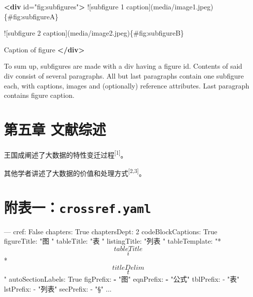\documentclass[]{article}
\newenvironment{Shaded}{}{}
\newcommand{\AttributeTok}[1]{\textcolor[rgb]{0.49,0.56,0.16}{#1}}
\newcommand{\FunctionTok}[1]{\textcolor[rgb]{0.02,0.16,0.49}{#1}}
\newcommand{\KeywordTok}[1]{\textcolor[rgb]{0.00,0.44,0.13}{\textbf{#1}}}
\newcommand{\NormalTok}[1]{#1}
\newcommand{\OtherTok}[1]{\textcolor[rgb]{0.00,0.44,0.13}{#1}}
\newcommand{\StringTok}[1]{\textcolor[rgb]{0.25,0.44,0.63}{#1}}
\begin{document}
\begin{Shaded}
\begin{Highlighting}[]
\KeywordTok{<div}\OtherTok{ id=}\StringTok{"fig:subfigures"}\KeywordTok{>}
\NormalTok{![subfigure 1 caption](media/image1.jpeg)\{#fig:subfigureA\}}

\NormalTok{![subfigure 2 caption](media/image2.jpeg)\{#fig:subfigureB\}}

\NormalTok{Caption of figure}
\KeywordTok{</div>}
\end{Highlighting}
\end{Shaded}

To sum up, subfigures are made with a div having a figure id. Contents
of said div consist of several paragraphs. All but last paragraphs
contain one subfigure each, with captions, images and (optionally)
reference attributes. Last paragraph contains figure caption.

\hypertarget{sec:ux7b2cux4e94ux7ae0-ux6587ux732eux7efcux8ff0}{%
\section{第五章
文献综述}\label{sec:ux7b2cux4e94ux7ae0-ux6587ux732eux7efcux8ff0}}

王国成阐述了大数据的特性变迁过程\textsuperscript{{[}1{]}}。

其他学者讲述了大数据的价值和处理方式\textsuperscript{{[}2,3{]}}。

\hypertarget{sec:ux9644ux8868ux4e00crossref.yaml}{%
\section*{\texorpdfstring{附表一：\texttt{crossref.yaml}}{附表一：crossref.yaml}}\label{sec:ux9644ux8868ux4e00crossref.yaml}}

\begin{Shaded}
\begin{Highlighting}[]
\OtherTok{---}
\FunctionTok{cref:}\AttributeTok{ False}
\FunctionTok{chapters:}\AttributeTok{ True}
\FunctionTok{chaptersDept:}\AttributeTok{ 2}
\FunctionTok{codeBlockCaptions:}\AttributeTok{ True}
\FunctionTok{figureTitle:}\AttributeTok{ }\StringTok{"图 "}
\FunctionTok{tableTitle:}\AttributeTok{ }\StringTok{"表 "}
\FunctionTok{listingTitle:}\AttributeTok{ }\StringTok{"列表 "}
\FunctionTok{tableTemplate:}\AttributeTok{ }\StringTok{"*$$tableTitle$$ $$i$$*$$titleDelim$$ $$t$$"}
\FunctionTok{autoSectionLabels:}\AttributeTok{ True}
\FunctionTok{figPrefix:}
  \KeywordTok{-} \StringTok{"图"}
\FunctionTok{eqnPrefix:}
  \KeywordTok{-} \StringTok{"公式"}
\StringTok{tblPrefix:}
\StringTok{  - "}\NormalTok{表}\StringTok{"}
\StringTok{lstPrefix:}
\StringTok{  - "}\NormalTok{列表}\StringTok{"}
\StringTok{secPrefix:}
\StringTok{  - "}\NormalTok{§}\StringTok{"}
\StringTok{...}
\end{Highlighting}
\end{Shaded}
\end{document}
